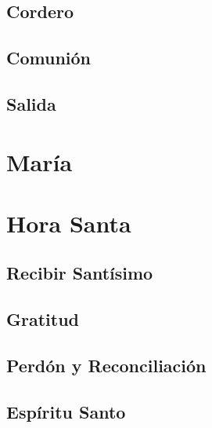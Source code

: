 \documentclass[a4paper,12pt]{book}
\begin{document}

\section{Cordero}



\section{Comunión}



\section{Salida}



\chapter{María}




\chapter{Hora Santa}

\section{Recibir Santísimo}



\section{Gratitud}



\section{Perdón y Reconciliación}



\section{Espíritu Santo}
\end{document}
